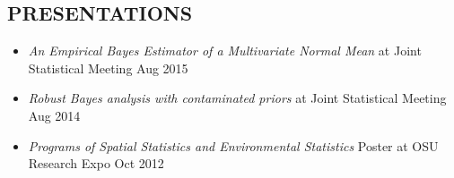 \documentclass[10pt]{res} %
\begin{document}
\begin{resume}


\section{PRESENTATIONS}

\vspace{15pt} %
\begin{itemize} \itemsep -2pt %
\item {\textit {An Empirical Bayes Estimator of  a Multivariate Normal Mean}} at Joint Statistical Meeting  \hfill Aug 2015
\item {\textit {Robust Bayes analysis with contaminated priors}} at Joint Statistical Meeting  \hfill Aug 2014
\item {\textit {Programs of Spatial Statistics and Environmental Statistics}} Poster at OSU Research Expo    \hfill Oct 2012
\end{itemize}














\end{resume}
\end{document}

